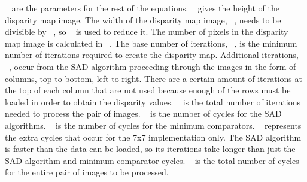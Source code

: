~ are the parameters for the rest of the equations. ~ gives the height of the disparity map image. The width of the disparity map image, ~, needs to be divisible by ~, so ~ is used to reduce it. The number of pixels in the disparity map image is calculated in ~. The base number of iterations, ~, is the minimum number of iterations required to create the disparity map. Additional iterations, ~, occur from the SAD algorithm proceeding through the images in the form of columns, top to bottom, left to right. There are a certain amount of iterations at the top of each column that are not used because enough of the rows must be loaded in order to obtain the disparity values. ~ is the total number of iterations needed to process the pair of images. ~ is the number of cycles for the SAD algorithms. ~ is the number of cycles for the minimum comparators. ~ represents the extra cycles that occur for the 7x7 implementation only. The SAD algorithm is faster than the data can be loaded, so its iterations take longer than just the SAD algorithm and minimum comparator cycles. ~ is the total number of cycles for the entire pair of images to be processed.

